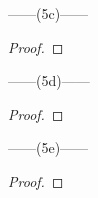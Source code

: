 \documentclass[12pt]{article}
\begin{document}
\noindent
\begin{center}
    ------(5c)------
\end{center} 
\begin{proof}
    
\end{proof}

\noindent
\begin{center}
    ------(5d)------
\end{center} 
\begin{proof}
    
\end{proof}

\noindent
\begin{center}
    ------(5e)------
\end{center} 
\begin{proof}
    
\end{proof}
\end{document}
